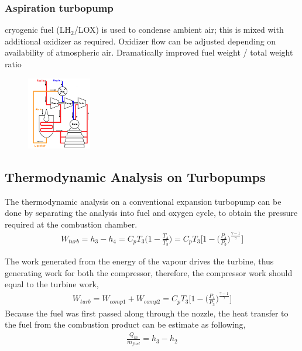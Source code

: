 \documentclass[a4paper,10pt]{article}
\begin{document}
\begin{multicols}{4}
\subsubsection{Aspiration turbopump}
cryogenic fuel (LH$_2$/LOX) is used to condense ambient air; this is mixed with additional oxidizer as required. Oxidizer flow can be adjusted depending on availability of atmospheric air. Dramatically improved fuel weight / total weight ratio 
\begin{figure}[H]
    \centering
    \includegraphics[width=0.25\textwidth]{Figure/aspiration.png}
\end{figure}
\end{multicols}

\subsection{Thermodynamic Analysis on Turbopumps}
The thermodynamic analysis on a conventional expansion turbopump can be done by separating the analysis into fuel and oxygen cycle, to obtain the pressure required at the combustion chamber. 
\begin{gather*}
    W_{turb} = h_3-h_4 = C_pT_3\Bigg(1-\frac{T_4}{T_3}\Bigg) = C_pT_3\Bigg[1-\Bigg(\frac{P_4}{P_3}\Bigg)^{\frac{\gamma-1}{\gamma}}\Bigg]
\end{gather*}

The work generated from the energy of the vapour drives the turbine, thus generating work for both the compressor, therefore, the compressor work should equal to the turbine work,
\begin{gather*}
    W_{turb} = W_{comp1}+W_{comp2} = C_pT_3\Bigg[1-\Bigg(\frac{P_4}{P_3}\Bigg)^{\frac{\gamma-1}{\gamma}}\Bigg]
\end{gather*}
Because the fuel was first passed along through the nozzle, the heat transfer to the fuel from the combustion product can be estimate as following, 
\begin{gather*}
    \frac{Q_{in}}{\dot{m}_{fuel}} = h_3-h_2
\end{gather*}
\end{document}
